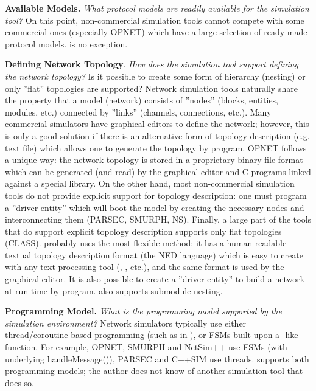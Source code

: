 \textbf{Available Models.} \textit{What protocol models are readily available
for the simulation tool?} On this point, non-commercial simulation
tools cannot compete with some commercial ones (especially OPNET)
which have a large selection of ready-made protocol models. {\opp}
is no exception.


\textbf{Defining Network Topology}. \textit{How does the simulation
  tool support defining the network topology?} Is it possible to
create some form of hierarchy (nesting) or only ''flat'' topologies
are supported? Network simulation tools naturally share the property
that a model (network) consists of ''nodes'' (blocks, entities,
modules, etc.) connected by ''links'' (channels, connections, etc.).
Many commercial simulators have graphical editors to define the
network; however, this is only a good solution if there is an
alternative form of topology description (e.g. text file) which allows
one to generate the topology by program. OPNET follows a unique way:
the network topology is stored in a proprietary binary file format
which can be generated (and read) by the graphical editor and C
programs linked against a special library. On the other hand, most
non-commercial simulation tools do not provide explicit support for
topology description: one must program a ''driver entity'' which will
boot the model by creating the necessary nodes and interconnecting
them (PARSEC, SMURPH, NS). Finally, a large part of the tools that do
support explicit topology description supports only flat topologies
(CLASS). {\opp} probably uses the most flexible method: it has a
human-readable textual topology description format (the NED language)
which is easy to create with any text-processing tool (,
, etc.), and the same format is used by the graphical
editor. It is also possible to create a ''driver entity'' to build a
network at run-time by program. {\opp} also supports submodule
nesting.


\textbf{Programming Model.} \textit{What is the programming model supported
by the simulation environment?} Network simulators typically use
either thread/coroutine-based programming (such as 
in {\opp}), or FSMs built upon a -like function.
For example, OPNET, SMURPH and NetSim++ use FSMs (with underlying
handleMessage()), PARSEC and C++SIM use threads. {\opp} supports
both programming models; the author does not know of another
simulation tool that does so.


